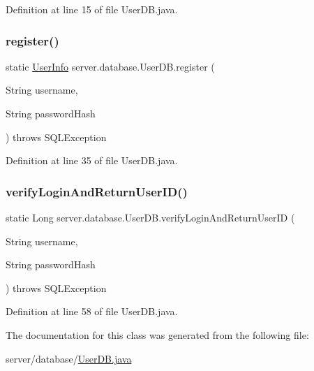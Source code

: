 Definition at line 15 of file User\+D\+B.\+java.

\hypertarget{classserver_1_1database_1_1_user_d_b_a8d4ba4100ff7d292c1f3354f1c533c09}{}\label{classserver_1_1database_1_1_user_d_b_a8d4ba4100ff7d292c1f3354f1c533c09} 
\subsubsection{\texorpdfstring{register()}{register()}}
{\footnotesize\ttfamily static \hyperlink{classsharedlib_1_1tuples_1_1_user_info}{User\+Info} server.\+database.\+User\+D\+B.\+register (\begin{DoxyParamCaption}\item[{String}]{username,  }\item[{String}]{password\+Hash }\end{DoxyParamCaption}) throws S\+Q\+L\+Exception\hspace{0.3cm}{\ttfamily [static]}}



Definition at line 35 of file User\+D\+B.\+java.

\hypertarget{classserver_1_1database_1_1_user_d_b_abfde8257ad4d22b2ce4c09de2074bc80}{}\label{classserver_1_1database_1_1_user_d_b_abfde8257ad4d22b2ce4c09de2074bc80} 
\subsubsection{\texorpdfstring{verify\+Login\+And\+Return\+User\+I\+D()}{verifyLoginAndReturnUserID()}}
{\footnotesize\ttfamily static Long server.\+database.\+User\+D\+B.\+verify\+Login\+And\+Return\+User\+ID (\begin{DoxyParamCaption}\item[{String}]{username,  }\item[{String}]{password\+Hash }\end{DoxyParamCaption}) throws S\+Q\+L\+Exception\hspace{0.3cm}{\ttfamily [static]}}



Definition at line 58 of file User\+D\+B.\+java.



The documentation for this class was generated from the following file\+:\begin{DoxyCompactItemize}
\item 
server/database/\hyperlink{_user_d_b_8java}{User\+D\+B.\+java}\end{DoxyCompactItemize}
